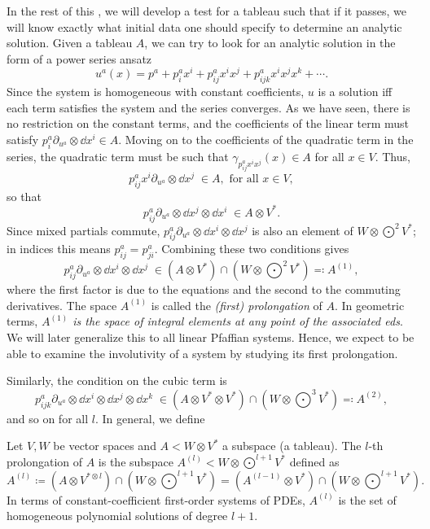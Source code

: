 In the rest of this \sect, we will develop a test for a tableau such that if it passes, we will know exactly what initial data one should specify to determine an analytic solution. Given a tableau $A$, we can try to look for an analytic solution in the form of a power series ansatz
\[u^a(x)=p^a+p^a_i x^i+ p^a_{ij}x^ix^j+p^a_{ijk}x^ix^jx^k+\cdots.\]
Since the system is homogeneous with constant coefficients, $u$ is a solution iff each term satisfies the system and the series converges. As we have seen, there is no restriction on the constant terms, and the coefficients of the linear term must satisfy $p^a_i\partial_{u^a}\otimes \dd x^i\in A$. Moving on to the coefficients of the quadratic term in the series, the quadratic term must be such that $\gamma_{p^a_{ij}x^ix^j}(x)\in A$ for all $x\in V$. Thus,
\[p^a_{ij}x^i\partial_{u^a}\otimes \dd x^j \; \in A,\text{ for all }x\in V, \]
so that 
\[p^a_{ij}\partial_{u^a}\otimes \dd x^j\otimes \dd x^i \;\in A\otimes V^\ast.\]
Since mixed partials commute, $p^a_{ij}\partial_{u^a}\otimes \dd x^i\otimes \dd x^j$ is also an element of $W\otimes \bigodot^2 V^\ast$; in indices this means $p^a_{ij}=p^a_{ji}$. Combining these two conditions gives 
\[p^a_{ij}\partial_{u^a}\otimes \dd x^i\otimes \dd x^j \; \in (A\otimes V^\ast)\cap (W\otimes \bigodot^2 V^\ast)\eqqcolon A^{(1)},\]
where the first factor is due to the equations and the second to the commuting derivatives. The space $A^{(1)}$ is called the \emph{(first) prolongation} of $A$. In geometric terms, \emph{$A^{(1)}$ is the space of integral elements at any point of the associated \gls{eds}}. We will later generalize this to all linear Pfaffian systems. Hence, we expect to be able to examine the involutivity of a system by studying its first prolongation. 

Similarly, the condition on the cubic term is 
\[p^a_{ijk}\partial_{u^a}\otimes \dd x^i\otimes\dd x^j\otimes\dd x^k\; \in(A\otimes V^\ast\otimes V^\ast)\cap (W\otimes \bigodot^3 V^\ast)\eqqcolon A^{(2)},\]
and so on for all $l$. In general, we define 

\begin{defn}[Prolongation]
    Let $V,W$ be vector spaces and $A<W\otimes V^\ast$ a subspace (a tableau). The $l$-th prolongation of $A$ is the subspace $A^{(l)}<W\otimes \bigodot^{l+1}V^\ast$ defined as
    \[A^{(l)}\coloneqq (A\otimes V^{\ast\otimes l})\cap (W\otimes \bigodot^{l+1} V^\ast)=(A^{(l-1)}\otimes V^\ast)\cap (W\otimes \bigodot^{l+1} V^\ast).\]
    In terms of constant-coefficient first-order systems of PDEs, $A^{(l)}$ is the set of homogeneous polynomial solutions of degree $l+1$.
\end{defn}

